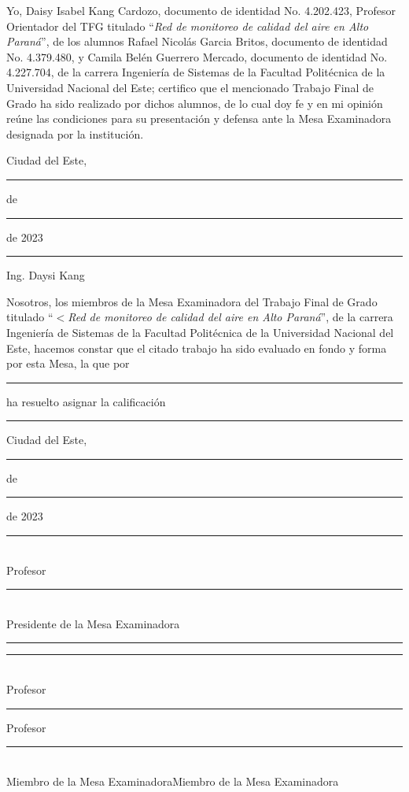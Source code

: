 \thispagestyle{empty}

Yo, Daisy Isabel Kang Cardozo, documento de identidad No. 4.202.423, Profesor Orientador del TFG titulado ``\textit{Red de monitoreo de calidad del aire en Alto Paraná}'', de los alumnos Rafael Nicolás Garcia Britos, documento de identidad No. 4.379.480, y Camila Belén Guerrero Mercado, documento de identidad No. 4.227.704, de la carrera Ingeniería de Sistemas de la Facultad Politécnica de la Universidad Nacional del Este; certifico que el mencionado Trabajo Final de Grado ha sido realizado por dichos alumnos, de lo cual doy fe y en mi opinión reúne las condiciones para su presentación y defensa ante la Mesa Examinadora designada por la institución.

\begin{flushright}Ciudad del Este, \rule{1cm}{0.4pt} de \rule{2cm}{0.4pt} de 2023\end{flushright}
\vspace{0.7cm}
	
\hspace{7cm}\rule{6cm}{0.4pt}
\begin{flushright}
Ing. Daysi Kang
\end{flushright}
		
\vspace{1.6cm}
Nosotros, los miembros de la Mesa Examinadora del Trabajo Final de Grado titulado ``$<$\textit{Red de monitoreo de calidad del aire en Alto Paraná}'', de la carrera Ingeniería de Sistemas de la Facultad Politécnica de la Universidad Nacional del Este, hacemos constar que el citado trabajo ha sido evaluado en fondo y forma por esta Mesa, la que por \rule{4cm}{0.4pt} ha resuelto asignar la calificación \rule{2cm}{0.4pt}

\begin{flushright}Ciudad del Este, \rule{1cm}{0.4pt} de \rule{2cm}{0.4pt} de 2023 \end{flushright}

\vspace{.5cm}
\hspace{2.2cm}\rule{7cm}{0.4pt}\\
\hspace*{3cm} Profesor \rule{4.5cm}{0.4pt}\\
\hspace*{2.8cm} Presidente de la Mesa Examinadora
\vspace{.7cm}

\hspace*{-0.4cm}\rule{6cm}{0.4pt}\hspace{1.15cm}\rule{6cm}{0.4pt}\\
\vspace{.3cm}
Profesor \rule{4.5cm}{0.4pt}		\hspace{.9cm}Profesor \rule{4.5cm}{0.4pt}\\
Miembro de la Mesa Examinadora\hspace{1cm}Miembro de la Mesa Examinadora
